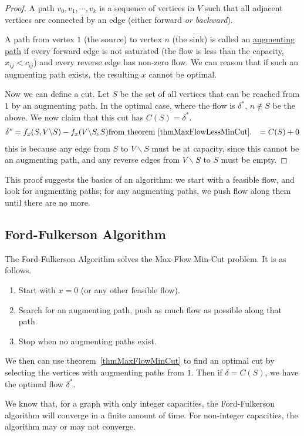 \documentclass[../Main.tex]{subfiles}
\begin{document}
\begin{proof}
    A path $v_0, v_1, \cdots, v_k$ is a sequence of vertices in $V$ such that all adjacent vertices are connected by an edge (either forward \textit{or backward}).

    A path from vertex $1$ (the source) to vertex $n$ (the sink) is called an \underline{augmenting path} if every forward edge is not saturated (the flow is less than the capacity, $x_{ij} < c_{ij}$) and every reverse edge has non-zero flow. We can reason that if such an augmenting path exists, the resulting $x$ cannot be optimal.

    Now we can define a cut. Let $S$ be the set of all vertices that can be reached from $1$ by an augmenting path. In the optimal case, where the flow is $\delta^*$, $n \notin S$ be the above. We now claim that this cut has $C(S) = \delta^*$.
    \begin{align*}
        \delta^*&= f_x(S, V\backslash S) - f_x(V \backslash S, S) \text{from theorem~\ref{thmMaxFlowLessMinCut}.}
        &= C(S) + 0
    \end{align*}
    this is because any edge from $S$ to $V \backslash S$ must be at capacity, since this cannot be an augmenting path, and any reverse edges from $V \backslash S$ to $S$ must be empty.
\end{proof}
This proof suggests the basics of an algorithm: we start with a feasible flow, and look for augmenting paths; for any augmenting paths, we push flow along them until there are no more.
\subsection{Ford-Fulkerson Algorithm}
The Ford-Fulkerson Algorithm solves the Max-Flow Min-Cut problem. It is as follows.
\begin{enumerate}
    \item Start with $x = 0$ (or any other feasible flow).
    \item Search for an augmenting path, push as much flow as possible along that path.
    \item Stop when no augmenting paths exist.
\end{enumerate}
We then can use theorem~\ref{thmMaxFlowMinCut} to find an optimal cut by selecting the vertices with augmenting paths from $1$. Then if $\delta = C(S)$, we have the optimal flow $\delta^*$.

We know that, for a graph with only integer capacities, the Ford-Fulkerson algorithm will converge in a finite amount of time. For non-integer capacities, the algorithm may or may not converge.
\end{document}
